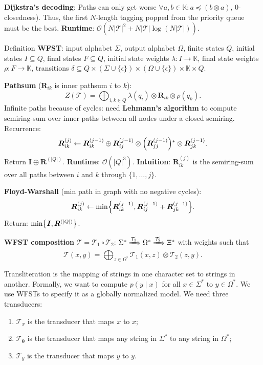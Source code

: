 \documentclass{article}
\newcommand{\lft}{\mathopen{}\left}
\newcommand{\rgt}{\aftergroup\mathclose\aftergroup{\aftergroup}\right}
\newenvironment{topic}[1]
{\begin{tcolorbox}[
  title=#1,
  breakable,
  colback=white,
  colframe=black,
  fonttitle={\bfseries\sffamily},
  sharp corners,
  boxrule=0.5pt,
  boxsep=0.1cm,
  top=0cm,
  bottom=0cm,
  left=0.1cm,
  right=0.1cm,
  enhanced jigsaw,
]}
{\end{tcolorbox}}
\begin{document}
\begin{multicols}{3}
\begin{topic}{Part-of-speech tagging}
  \textbf{Dijkstra's decoding}: Paths can only get worse $\forall
  a,b\in\mathbb{K}: a \preceq (b \otimes a)$, 0-closedness). Thus, the first
  $N$-length tagging popped from the priority queue must be the best.
  \textbf{Runtime}: $\mathcal{O}(N|\mathcal{T}|^2 + N |\mathcal{T}| \log
  (N|\mathcal{T}|))$.
\end{topic}

\begin{topic}{Finite-state automata}
  Definition \textbf{WFST}: input alphabet $\Sigma$, output alphabet $\Omega$,
  finite states $Q$, initial states $I\subseteq Q$, final states $F\subseteq
  Q$, initial state weights $\lambda: I \to \mathbb{K}$, final state weights
  $\rho: F\to\mathbb{K}$, transitions $\delta\subseteq Q\times(\Sigma \cup \{
    \epsilon \}) \times (\Omega\cup\{\epsilon\})\times\mathbb{K}\times Q$.

  \textbf{Pathsum} ($\bm{R}_{ik}$ is inner pathsum $i$ to $k$): \[
    Z(\mathcal{T}) = \bigoplus_{i,k\in Q} \lambda(q_i) \otimes \bm{R}_{ik} \otimes \rho(q_k)
  .\]
  Infinite paths because of cycles: need \textbf{Lehmann's algorithm} to
  compute semiring-sum over inner paths between all nodes under a closed
  semiring. Recurrence: \[
    \bm{R}_{ik}^{(j)} \gets \bm{R}_{ik}^{(j-1)} \oplus \bm{R}_{ij}^{(j-1)} \otimes \lft( \bm{R}_{jj}^{(j-1)} \rgt)^* \otimes \bm{R}_{jk}^{(j-1)}
  .\]
  Return $\bm{I} \oplus \bm{R}^{(|Q|)}$. \textbf{Runtime}:
  $\mathcal{O}(|Q|^3)$. \textbf{Intuition}: $\bm{R}_{ik}^{(j)}$ is the
  semiring-sum over all paths between $i$ and $k$ through $\{ 1,\ldots,j \}$.

  \textbf{Floyd-Warshall} (min path in graph with no negative cycles): \[
    \bm{R}_{ik}^{(j)} \gets \min \lft\{ \bm{R}_{ik}^{(j-1)}, \bm{R}_{ij}^{(j-1)} + \bm{R}_{jk}^{(j-1)} \rgt\}
  .\]
  Return: $\min \lft\{ \bm{I}, \bm{R}^{(|Q|)} \rgt\}$.

  \textbf{WFST composition} $\mathcal{T} = \mathcal{T}_1 \circ \mathcal{T}_2$:
  $\Sigma^* \xRightarrow{\mathcal{T}_1} \Omega^* \xRightarrow{\mathcal{T}_2}
  \Xi^*$ with weights such that \[
    \mathcal{T}(x,y) = \bigoplus_{z\in\Omega^*} \mathcal{T}_1(x,z) \otimes \mathcal{T}_2(z,y)
  .\]
\end{topic}

\begin{topic}{Transliteration}
  Transliteration is the mapping of strings in one character set to strings in
  another. Formally, we want to compute $p(y\mid x)$ for all $x\in\Sigma^*$ to
  $y\in\Omega^*$. We use WFSTs to specify it as a globally normalized model. We
  need three transducers:
  \begin{enumerate}
    \item $\mathcal{T}_x$ is the transducer that maps $x$ to $x$;
    \item $\mathcal{T}_{\bm{\theta}}$ is the transducer that maps any string in
      $\Sigma^*$ to any string in $\Omega^*$;
    \item $\mathcal{T}_y$ is the transducer that maps $y$ to $y$.
  \end{enumerate}


\end{topic}
\end{multicols}
\end{document}
